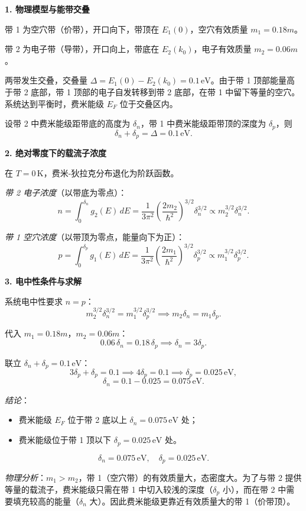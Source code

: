 \begin{derivationbox}[标准解题过程]
\textbf{1. 物理模型与能带交叠}

带 1 为空穴带（价带），开口向下，带顶在 $E_1(0)$，空穴有效质量 $m_1=0.18m$。

带 2 为电子带（导带），开口向上，带底在 $E_2(k_0)$，电子有效质量 $m_2=0.06m$。

两带发生交叠，交叠量 $\Delta=E_1(0)-E_2(k_0)=0.1\,\text{eV}$。由于带 1 顶部能量高于带 2 底部，带 1 顶部的电子自发转移到带 2 底部，在带 1 中留下等量的空穴。系统达到平衡时，费米能级 $E_F$ 位于交叠区内。

设带 2 中费米能级距带底的高度为 $\delta_n$，带 1 中费米能级距带顶的深度为 $\delta_p$，则
\[
\delta_n+\delta_p=\Delta=0.1\,\text{eV}.
\]

\textbf{2. 绝对零度下的载流子浓度}

在 $T=0\,\text{K}$，费米-狄拉克分布退化为阶跃函数。

\textit{带 2 电子浓度}（以带底为零点）：
\[
n=\int_0^{\delta_n}g_2(E)\,dE=\frac{1}{3\pi^2}\left(\frac{2m_2}{\hbar^2}\right)^{3/2}\delta_n^{3/2}\propto m_2^{3/2}\delta_n^{3/2}.
\]

\textit{带 1 空穴浓度}（以带顶为零点，能量向下为正）：
\[
p=\int_0^{\delta_p}g_1(E)\,dE=\frac{1}{3\pi^2}\left(\frac{2m_1}{\hbar^2}\right)^{3/2}\delta_p^{3/2}\propto m_1^{3/2}\delta_p^{3/2}.
\]

\textbf{3. 电中性条件与求解}

系统电中性要求 $n=p$：
\[
m_2^{3/2}\delta_n^{3/2}=m_1^{3/2}\delta_p^{3/2}
\implies m_2\delta_n=m_1\delta_p.
\]

代入 $m_1=0.18m$，$m_2=0.06m$：
\[
0.06\,\delta_n=0.18\,\delta_p
\implies \delta_n=3\delta_p.
\]

联立 $\delta_n+\delta_p=0.1\,\text{eV}$：
\[
3\delta_p+\delta_p=0.1
\implies 4\delta_p=0.1
\implies \delta_p=0.025\,\text{eV},
\]
\[
\delta_n=0.1-0.025=0.075\,\text{eV}.
\]

\textit{结论}：
\begin{itemize}
    \item 费米能级 $E_F$ 位于带 2 底以上 $\delta_n=0.075\,\text{eV}$ 处；
    \item 费米能级位于带 1 顶以下 $\delta_p=0.025\,\text{eV}$ 处。
\end{itemize}

\begin{equation}
\boxed{\delta_n=0.075\,\text{eV},\quad \delta_p=0.025\,\text{eV}.}
\end{equation}

\textit{物理分析}：$m_1>m_2$，带 1（空穴带）的有效质量大，态密度大。为了与带 2 提供等量的载流子，费米能级只需在带 1 中切入较浅的深度（$\delta_p$ 小），而在带 2 中需要填充较高的能量（$\delta_n$ 大）。因此费米能级更靠近有效质量大的带 1（价带顶）。
\end{derivationbox}

